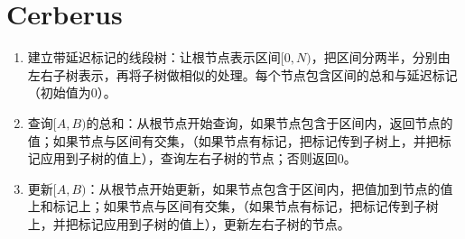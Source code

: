 \documentclass[a4paper]{ctexart}
\begin{document}
	\section{Cerberus}
	\begin{enumerate}
		\item 建立带延迟标记的线段树：让根节点表示区间$[0,N)$，把区间分两半，分别由左右子树表示，再将子树做相似的处理。每个节点包含区间的总和与延迟标记（初始值为0）。
		\item 查询$[A,B)$的总和：从根节点开始查询，如果节点包含于区间内，返回节点的值；如果节点与区间有交集，（如果节点有标记，把标记传到子树上，并把标记应用到子树的值上），查询左右子树的节点；否则返回0。
		\item 更新$[A,B)$：从根节点开始更新，如果节点包含于区间内，把值加到节点的值上和标记上；如果节点与区间有交集，（如果节点有标记，把标记传到子树上，并把标记应用到子树的值上），更新左右子树的节点。
	\end{enumerate}
\end{document}

